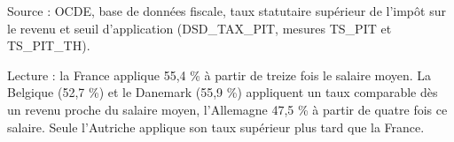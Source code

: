 Source : OCDE, base de données fiscale, taux statutaire supérieur de l'impôt sur le revenu et seuil d'application (DSD\_TAX\_PIT, mesures TS\_PIT et TS\_PIT\_TH).\par Lecture : la France applique 55,4 \% à partir de treize fois le salaire moyen. La Belgique (52,7 \%) et le Danemark (55,9 \%) appliquent un taux comparable dès un revenu proche du salaire moyen, l'Allemagne 47,5 \% à partir de quatre fois ce salaire. Seule l'Autriche applique son taux supérieur plus tard que la France.
